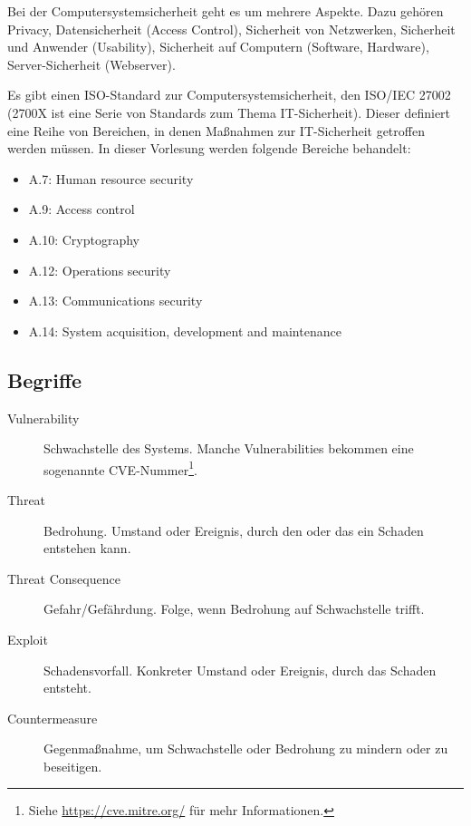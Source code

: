 \documentclass[ngerman]{scrartcl}
\begin{document}
Bei der Computersystemsicherheit geht es um mehrere Aspekte. Dazu gehören Privacy, Datensicherheit (Access Control), Sicherheit von Netzwerken, Sicherheit und Anwender (Usability), Sicherheit auf Computern (Software, Hardware), Server-Sicherheit (Webserver).

Es gibt einen ISO-Standard zur Computersystemsicherheit, den ISO/IEC 27002 (2700X ist eine Serie von Standards zum Thema IT-Sicherheit). Dieser definiert eine Reihe von Bereichen, in denen Maßnahmen zur IT-Sicherheit getroffen werden müssen. In dieser Vorlesung werden folgende Bereiche behandelt:
\begin{itemize}
\item A.7: Human resource security
\item A.9: Access control
\item A.10: Cryptography
\item A.12: Operations security
\item A.13: Communications security
\item A.14: System acquisition, development and maintenance  
\end{itemize}

\subsection{Begriffe}

\begin{description}
\item[Vulnerability] Schwachstelle des Systems. Manche Vulnerabilities bekommen eine sogenannte CVE-Nummer\footnote{Siehe \url{https://cve.mitre.org/} für mehr Informationen.}.
\item[Threat] Bedrohung. Umstand oder Ereignis, durch den oder das ein Schaden entstehen kann.
\item[Threat Consequence] Gefahr/Gefährdung. Folge, wenn Bedrohung auf Schwachstelle trifft.
\item[Exploit] Schadensvorfall. Konkreter Umstand oder Ereignis, durch das Schaden entsteht.
\item[Countermeasure] Gegenmaßnahme, um Schwachstelle oder Bedrohung zu mindern oder zu beseitigen.
\end{description}
\end{document}
